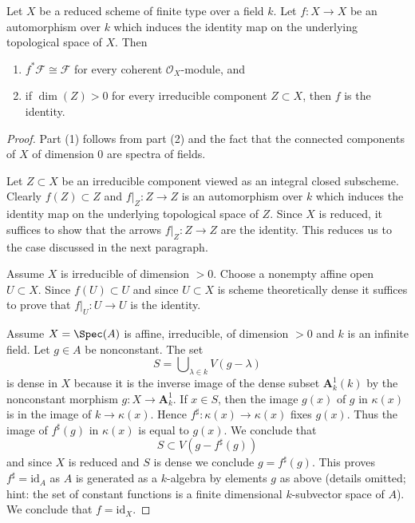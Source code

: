 \begin{lemma}
\label{lemma-automorphism}
Let $X$ be a reduced scheme of finite type over a field $k$. Let $f : X \to X$
be an automorphism over $k$ which induces the identity map on the underlying
topological space of $X$. Then
\begin{enumerate}
\item $f^*\mathcal{F} \cong \mathcal{F}$ for every coherent
$\mathcal{O}_X$-module, and
\item if $\dim(Z) > 0$ for every irreducible component $Z \subset X$,
then $f$ is the identity.
\end{enumerate}
\end{lemma}

\begin{proof}
Part (1) follows from part (2) and the fact that the connected components
of $X$ of dimension $0$ are spectra of fields.

\medskip\noindent
Let $Z \subset X$ be an irreducible component viewed as an integral closed
subscheme. Clearly $f(Z) \subset Z$ and $f|_Z : Z \to Z$ is an automorphism
over $k$ which induces the identity map on the underlying topological space
of $Z$. Since $X$ is reduced, it suffices to show that the arrows
$f|_Z : Z \to Z$ are the identity. This reduces us to the case discussed
in the next paragraph.

\medskip\noindent
Assume $X$ is irreducible of dimension $> 0$. Choose a nonempty
affine open $U \subset X$. Since $f(U) \subset U$ and since
$U \subset X$ is scheme theoretically dense it suffices to
prove that $f|_U : U \to U$ is the identity.

\medskip\noindent
Assume $X = \Spec(A)$ is affine, irreducible, of dimension $> 0$
and $k$ is an infinite field. Let $g \in A$ be nonconstant. The set
$$
S = \bigcup\nolimits_{\lambda \in k} V(g - \lambda)
$$
is dense in $X$ because it is the inverse image of the dense subset
$\mathbf{A}^1_k(k)$ by the nonconstant morphism $g : X \to \mathbf{A}^1_k$.
If $x \in S$, then the image $g(x)$ of $g$ in $\kappa(x)$
is in the image of $k \to \kappa(x)$. Hence
$f^\sharp : \kappa(x) \to \kappa(x)$ fixes $g(x)$.
Thus the image of $f^\sharp(g)$ in $\kappa(x)$ is equal to $g(x)$.
We conclude that
$$
S \subset V(g - f^\sharp(g))
$$
and since $X$ is reduced and $S$ is dense we conclude $g=f^\sharp(g)$.
This proves $f^\sharp = \text{id}_A$ as $A$ is generated as a $k$-algebra
by elements $g$ as above (details omitted; hint: the set of constant
functions is a finite dimensional $k$-subvector space of $A$).
We conclude that $f = \text{id}_X$.


\end{proof}
